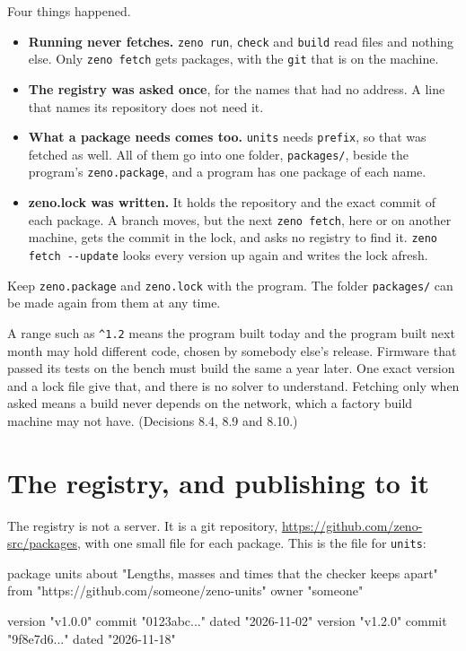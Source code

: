 Four things happened.

\begin{itemize}
\item \textbf{Running never fetches.} \verb|zeno run|, \verb|check|
  and \verb|build| read files and nothing else. Only \verb|zeno fetch|
  gets packages, with the \verb|git| that is on the machine.
\item \textbf{The registry was asked once}, for the names that had no
  address. A line that names its repository does not need it.
\item \textbf{What a package needs comes too.} \verb|units| needs
  \verb|prefix|, so that was fetched as well. All of them go into one
  folder, \verb|packages/|, beside the program's \verb|zeno.package|,
  and a program has one package of each name.
\item \textbf{zeno.lock was written.} It holds the repository and the
  exact commit of each package. A branch moves, but the next
  \verb|zeno fetch|, here or on another machine, gets the commit in
  the lock, and asks no registry to find it.
  \verb|zeno fetch --update| looks every version up again and writes
  the lock afresh.
\end{itemize}

Keep \verb|zeno.package| and \verb|zeno.lock| with the program. The
folder \verb|packages/| can be made again from them at any time.

\begin{why}
A range such as \verb|^1.2| means the program built today and the
program built next month may hold different code, chosen by somebody
else's release. Firmware that passed its tests on the bench must build
the same a year later. One exact version and a lock file give that,
and there is no solver to understand. Fetching only when asked means a
build never depends on the network, which a factory build machine may
not have. (Decisions 8.4, 8.9 and 8.10.)
\end{why}

\section{The registry, and publishing to it}

The registry is not a server. It is a git repository,
\url{https://github.com/zeno-src/packages}, with one small file for each
package. This is the file for \verb|units|:

\begin{zenofrag}[lang=shell]
package units
about "Lengths, masses and times that the checker keeps apart"
from "https://github.com/someone/zeno-units"
owner "someone"

version "v1.0.0" commit "0123abc..." dated "2026-11-02"
version "v1.2.0" commit "9f8e7d6..." dated "2026-11-18"
\end{zenofrag}

